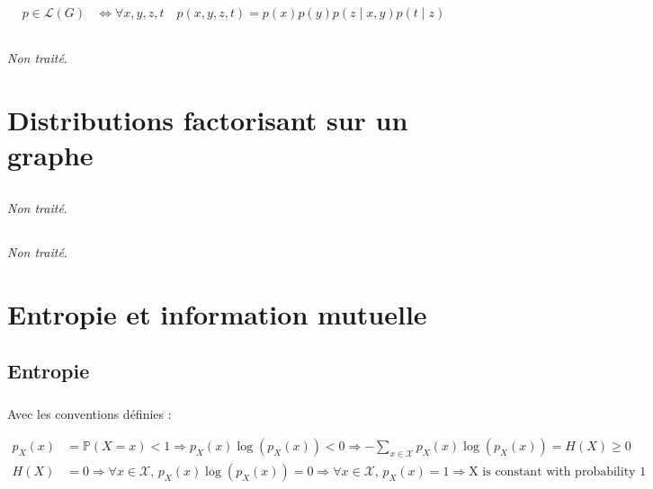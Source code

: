 \documentclass[12pt,a4paper,onecolumn]{article}
\begin{document}
\begin{equation}
	\begin{split}
		p \in \mathcal{L}(G) &\Leftrightarrow \forall x, y, z, t \quad p(x, y, z, t) = p(x)p(y)p(z \mid  x, y) p(t \mid z)
	\end{split}
\end{equation}



\subsection{}

\textit{Non traité}.

\section{Distributions factorisant sur un graphe}

\subsection{}
\textit{Non traité}.

\subsection{}
\textit{Non traité}.

\clearpage

\section{Entropie et information mutuelle}

\subsection{Entropie}

\subsubsection{}

Avec les conventions définies :

\begin{equation}
	\begin{split}
		p_X(x) &= \mathbb{P}(X = x) < 1 \Rightarrow p_X(x)\log(p_X(x)) < 0 \Rightarrow -\sum_{x \in \mathcal{X}} p_X(x)\log(p_X(x)) = H(X) \geq 0 \\
		H(X) &= 0 \Rightarrow \forall x \in \mathcal{X},\, p_X(x)\log(p_X(x)) = 0 \Rightarrow \forall x \in \mathcal{X},\, p_X(x) = 1 \Rightarrow \text{X is constant with probability 1}
	\end{split}
	\label{eq_31a}
\end{equation}
\end{document}

